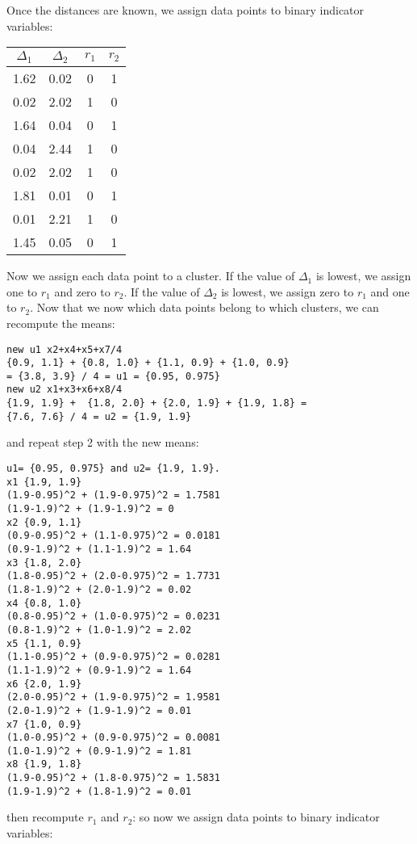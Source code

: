 \documentclass{article}
\begin{document}
Once the distances are known, we assign data points to binary indicator variables:
\begin{center}
 \begin{tabular}{||c c c c||} 
 \hline
 $\Delta_1$ & $\Delta_2$ & $r_1$ & $r_2$  \\ [0.5ex] 
 \hline\hline
 1.62 & 0.02 & 0 & 1 \\ 
 \hline
 0.02 & 2.02  & 1 & 0 \\ 
 \hline
1.64 & 0.04 & 0 & 1 \\
 \hline
0.04 & 2.44 & 1 & 0 \\
 \hline
 0.02 & 2.02 & 1 & 0 \\ 
  \hline
1.81 & 0.01 & 0 & 1 \\
 \hline
0.01 & 2.21 & 1 & 0 \\
 \hline
 1.45 & 0.05 & 0 & 1 \\ [1ex] 
 \hline
\end{tabular}
\end{center}
Now we assign each data point to a cluster. If the value of $\Delta_1$ is lowest, we assign one to $r_1$ and zero to $r_2$. If the value of $\Delta_2$ is lowest, we assign zero to $r_1$ and one to $r_2$. Now that we now which data points belong to which clusters, we can recompute the means:
\begin{verbatim}
new u1 x2+x4+x5+x7/4 
{0.9, 1.1} + {0.8, 1.0} + {1.1, 0.9} + {1.0, 0.9} 
= {3.8, 3.9} / 4 = u1 = {0.95, 0.975}
new u2 x1+x3+x6+x8/4 
{1.9, 1.9} +  {1.8, 2.0} + {2.0, 1.9} + {1.9, 1.8} = 
{7.6, 7.6} / 4 = u2 = {1.9, 1.9}
\end{verbatim}
and repeat step 2 with the new means:
\begin{verbatim}
u1= {0.95, 0.975} and u2= {1.9, 1.9}.
x1 {1.9, 1.9}
(1.9-0.95)^2 + (1.9-0.975)^2 = 1.7581
(1.9-1.9)^2 + (1.9-1.9)^2 = 0
x2 {0.9, 1.1}
(0.9-0.95)^2 + (1.1-0.975)^2 = 0.0181
(0.9-1.9)^2 + (1.1-1.9)^2 = 1.64
x3 {1.8, 2.0}
(1.8-0.95)^2 + (2.0-0.975)^2 = 1.7731
(1.8-1.9)^2 + (2.0-1.9)^2 = 0.02
x4 {0.8, 1.0}
(0.8-0.95)^2 + (1.0-0.975)^2 = 0.0231
(0.8-1.9)^2 + (1.0-1.9)^2 = 2.02
x5 {1.1, 0.9}
(1.1-0.95)^2 + (0.9-0.975)^2 = 0.0281
(1.1-1.9)^2 + (0.9-1.9)^2 = 1.64
x6 {2.0, 1.9}
(2.0-0.95)^2 + (1.9-0.975)^2 = 1.9581
(2.0-1.9)^2 + (1.9-1.9)^2 = 0.01
x7 {1.0, 0.9}
(1.0-0.95)^2 + (0.9-0.975)^2 = 0.0081
(1.0-1.9)^2 + (0.9-1.9)^2 = 1.81
x8 {1.9, 1.8}
(1.9-0.95)^2 + (1.8-0.975)^2 = 1.5831
(1.9-1.9)^2 + (1.8-1.9)^2 = 0.01
\end{verbatim}
then recompute $r_1$ and $r_2$:
so now we assign data points to binary indicator variables:
\end{document}
